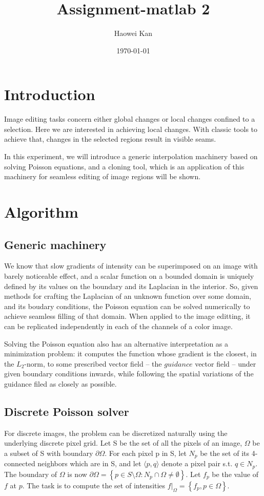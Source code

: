 \documentclass[12pt]{article}
\begin{document}
\title {Assignment-matlab 2}
\date{\today}
\author{Haowei Kan}
\maketitle
\section{Introduction}
Image editing tasks concern either global changes or local changes confined to a selection. Here we are interested in achieving local changes. With classic tools to achieve that, changes in the selected regions result in visible seams.

In this experiment, we will introduce a generic interpolation machinery based on solving Poisson equations, and a cloning tool, which is an application of this machinery for seamless editing of image regions will be shown.

\section{Algorithm}
\subsection{Generic machinery}
We know that slow gradients of intensity can be superimposed on an image with barely noticeable effect, and a scalar function on a bounded domain is uniquely defined by its values on the boundary and its Laplacian in the interior. So, given methods for crafting the Laplacian of an unknown function over some domain, and its boudary conditions, the Poisson equation can be solved numerically to achieve seamless filling of that domain. When applied to the image editting, it can be replicated independently in each of the channels of a color image.

Solving the Poisson equation also has an alternative interpretation as a minimization problem: it computes the function whose gradient is the closest, in the $L_2$-norm, to some prescribed vector field -- the $guidance$ vector field -- under given boundary conditions inwards, while following the spatial variations of the guidance filed as closely as possible.
\subsection{Discrete Poisson solver}
For discrete images, the problem can be discretized naturally using the underlying discrete pixel grid. Let S be the set of all the pixels of an image, $\Omega$ be a subset of S with boundary $\partial\Omega$. For each pixel p in S, let $N_p$ be the set of its 4-connected neighbors which are in S, and let $\langle p,q\rangle$ denote a pixel pair s.t. $q\in N_p$. The boundary of $\Omega$ is now $\partial\Omega=\left\{p\in S\setminus\Omega:N_p\cap\Omega\neq\emptyset\right\}$. Let $f_p$ be the value of $f$ at $p$. The task is to compute the set of intensities $f|_\Omega=\left\{f_p,p\in\Omega\right\}$.
\end{document}
